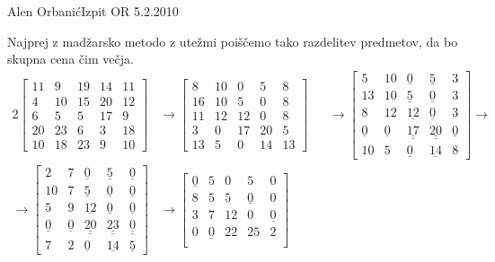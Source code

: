 \begin{naloga}{Alen Orbanić}{Izpit OR 5.2.2010}
\begin{odgovor}
Najprej z madžarsko metodo z utežmi poiščemo tako razdelitev predmetov,
da bo skupna cena čim večja.
\begin{alignat*}{2}
\begin{bmatrix}
11 &  9 & 19 & 14 & 11 \\
 4 & 10 & 15 & 20 & 12 \\
 6 &  5 &  5 & 17 & 9  \\
20 & 23 &  6 &  3 & 18 \\
10 & 18 & 23 &  9 & 10
\end{bmatrix}
&\to
\begin{bmatrix}
 8 & 10 &  0 &  5 &  8 \\
16 & 10 &  5 &  0 &  8 \\
11 & 12 & 12 &  0 &  8 \\
 3 &  0 & 17 & 20 &  5 \\
13 &  5 &  0 & 14 & 13
\end{bmatrix}
&&\to
\begin{bmatrix}
 5 & 10 & \underline{ 0} & \underline{ 5} & 3 \\
13 & 10 & \underline{ 5} & \underline{ 0} & 3 \\
 8 & 12 & \underline{12} & \underline{ 0} & 3 \\
\underline{0} & \underline{0} & \underline{\underline{17}}
& \underline{\underline{20}} & \underline{0} \\
10 &  5 & \underline{ 0} & \underline{14} & 8
\end{bmatrix}
\to \\ \to
\begin{bmatrix}
 2 & 7 & \underline{ 0} & \underline{ 5} & \underline{0} \\
10 & 7 & \underline{ 5} & \underline{ 0} & \underline{0} \\
 5 & 9 & \underline{12} & \underline{ 0} & \underline{0} \\
\underline{0} & \underline{0} & \underline{\underline{20}}
& \underline{\underline{23}} & \underline{\underline{0}} \\
 7 & 2 & \underline{ 0} & \underline{14} & \underline{5}
\end{bmatrix}
&\to
\begin{bmatrix}
\underline{0} & 5 &  0 &  5 & 0 \\
 8 & 5 &  5 & \underline{0} & 0 \\
 3 & 7 & 12 &  0 & \underline{0} \\
 0 & \underline{0} & 22 & 25 & 2 \\

\end{bmatrix}
\end{alignat*}
\end{odgovor}
\end{naloga}
